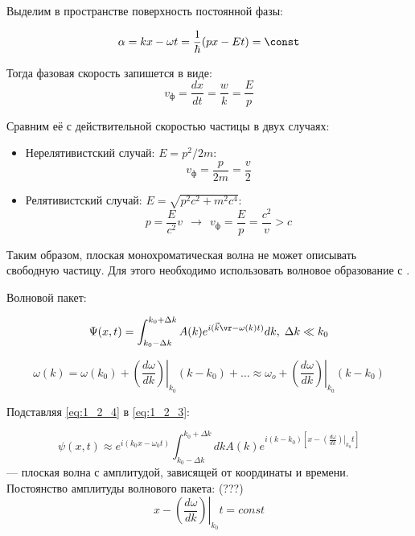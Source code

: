 Выделим в пространстве поверхность постоянной фазы:

$$\alpha = k x - \omega t = \frac{1}{\hbar} (px - Et) = \const$$

Тогда фазовая скорость запишется в виде:\\
\begin{equation}
\label{eq:1_2_2}
v_{\text{ф}} = \frac{dx}{dt} = \frac{w}{k} = \frac{E}{p}
\end{equation}

Сравним её с действительной скоростью частицы в двух случаях:

\begin{itemize}
\item Нерелятивистский случай: $E = p^2/{2m}$:  $$v_{\text{ф}} = \frac{p}{2m} = \frac{v}{2}$$
\item  Релятивистский случай: $E = \sqrt{p^2c^2 + m^2c^4}$: $$p = \frac{E}{c^2}v~~\rightarrow~~v_{\text{ф}} = \frac{E}{p} = \frac{c^2}{v} > c$$
\end{itemize}

Таким образом, плоская монохроматическая волна  не может описывать свободную частицу. Для этого необходимо использовать волновое образование с .

Волновой пакет:

\begin{equation}
\label{eq:1_2_3}
\Psi(x,t) = \int^{k_0 + \Delta k}_{k_0 - \Delta k} A(k)e^{i(\vec{k}\vr - \omega (k) t)} dk, \; \Delta k\ll k_0
\end{equation}

\begin{equation}
\label{eq:1_2_4}
\omega (k) = \omega (k_0) + \left. \left ( \frac{d \omega}{dk} \right ) \right |_{k_0} (k-k_0) + \ldots \approx \omega_o +  \left. \left ( \frac{d \omega}{dk} \right ) \right |_{k_0} (k-k_0)
\end{equation}

Подставляя \eqref{eq:1_2_4} в \eqref{eq:1_2_3}:

\begin{equation}
\label{eq:1_2_5}
\psi(x,t) \approx e^{i(k_0 x - \omega_0 t) }\int^{k_0 + \Delta k}_{k_0 - \Delta k} dk A(k)e^{i(k - k_0) \left [ x - \left . \left ( \frac{d\omega}{dk} \right ) \right |_{k_0} t \right ]}
\end{equation}
--- плоская волна с амплитудой, зависящей от координаты и времени.\\

Постоянство амплитуды волнового пакета: (???)\\
\begin{equation}
\label{eq:1_2_6}
x - \left . \left ( \frac{d\omega}{dk} \right ) \right |_{k_0} t = const
\end{equation}

